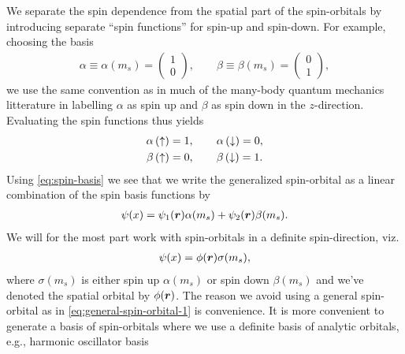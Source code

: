         We separate the spin dependence from the spatial part of the
        spin-orbitals by introducing separate ``spin functions'' for spin-up and
        spin-down.
        For example, choosing the basis
        \begin{align}
            \alpha \equiv \alpha(m_s) = \begin{pmatrix}
                1 \\
                0
            \end{pmatrix},
            \qquad
            \beta \equiv \beta(m_s) = \begin{pmatrix}
                0 \\
                1
            \end{pmatrix},
            \label{eq:spin-basis}
        \end{align}
        we use the same convention as in much of the many-body quantum mechanics
        litterature in labelling $\alpha$ as spin up and $\beta$ as spin down in
        the $z$-direction.
        Evaluating the spin functions thus yields
        \begin{gather}
            \alpha\left( \uparrow \right) = 1, \qquad \alpha\left( \downarrow \right) = 0, \\
            \beta\left( \uparrow \right) = 0, \qquad \beta\left( \downarrow \right) = 1.
        \end{gather}
        Using \autoref{eq:spin-basis} we see that we write the
        generalized spin-orbital as a linear combination of the spin basis
        functions by
        \begin{align}
            \psi(x)
            = \psi_1(\boldsymbol{r})\alpha(m_s)
            + \psi_2(\boldsymbol{r})\beta(m_s).
            \label{eq:general-spin-orbital-1}
        \end{align}
        We will for the most part work with spin-orbitals in a definite
        spin-direction, viz.
        \begin{align}
            \psi(x) = \phi(\boldsymbol{r})\sigma(m_s),
            \label{eq:spin-orbital}
        \end{align}
        where $\sigma(m_s)$ is either spin up $\alpha(m_s)$ or spin down
        $\beta(m_s)$ and we've denoted the spatial orbital by $\phi(\boldsymbol{r})$.
        The reason we avoid using a general spin-orbital as in
        \autoref{eq:general-spin-orbital-1} is convenience.
        It is more convenient to generate a basis of spin-orbitals where we use
        a definite basis of analytic orbitals, e.g., harmonic oscillator basis
